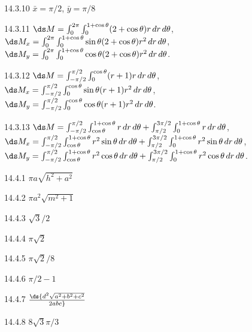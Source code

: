 \begin{Answer}{14.3.10}
$\bar x=\pi/2$, $\bar y=\pi/8$
\end{Answer}
\begin{Answer}{14.3.11}
$\ds M=\int_0^{2\pi} \int_0^{1+\cos\theta} (2+\cos\theta)r\,dr\,d\theta$,
\hfill\break
$\ds M_x=\int_0^{2\pi} \int_0^{1+\cos\theta} \sin\theta(2+\cos\theta)r^2\,dr\,d\theta$,
\hfill\break
$\ds M_y=\int_0^{2\pi} \int_0^{1+\cos\theta} \cos\theta(2+\cos\theta)r^2\,dr\,d\theta$.
\end{Answer}
\begin{Answer}{14.3.12}
$\ds M=\int_{-\pi/2}^{\pi/2} \int_0^{\cos\theta} (r+1)r\,dr\,d\theta$,
\hfill\break
$\ds M_x=\int_{-\pi/2}^{\pi/2} \int_0^{\cos\theta} \sin\theta(r+1)r^2\,dr\,d\theta$,
\hfill\break
$\ds M_y=\int_{-\pi/2}^{\pi/2} \int_0^{\cos\theta} \cos\theta(r+1)r^2\,dr\,d\theta$.
\end{Answer}
\begin{Answer}{14.3.13}
$\ds M= \int_{-\pi/2}^{\pi/2}\int_{\cos\theta}^{1+\cos\theta}
r\,dr\,d\theta + \int_{\pi/2}^{3\pi/2}\int_0^{1+\cos\theta}r\,dr\,d\theta$,
\hfill\break
$\ds M_x=\int_{-\pi/2}^{\pi/2}\int_{\cos\theta}^{1+\cos\theta}
r^2\sin\theta\,dr\,d\theta + \int_{\pi/2}^{3\pi/2}\int_0^{1+\cos\theta}r^2\sin\theta\,dr\,d\theta$,
\hfill\break
$\ds M_y=\int_{-\pi/2}^{\pi/2}\int_{\cos\theta}^{1+\cos\theta}
r^2\cos\theta\,dr\,d\theta + \int_{\pi/2}^{3\pi/2}\int_0^{1+\cos\theta}r^2\cos\theta\,dr\,d\theta$.
\end{Answer}
\begin{Answer}{14.4.1}
$\pi a\sqrt{h^2+a^2}$
\end{Answer}
\begin{Answer}{14.4.2}
$\pi a^2\sqrt{m^2+1}$
\end{Answer}
\begin{Answer}{14.4.3}
$\sqrt3/2$
\end{Answer}
\begin{Answer}{14.4.4}
$\pi\sqrt2$
\end{Answer}
\begin{Answer}{14.4.5}
$\pi\sqrt2/8$
\end{Answer}
\begin{Answer}{14.4.6}
$\pi/2-1$
\end{Answer}
\begin{Answer}{14.4.7}
$\ds {d^2\sqrt{a^2+b^2+c^2}\over 2abc}$
\end{Answer}
\begin{Answer}{14.4.8}
$8\sqrt{3}\pi/3$
\end{Answer}
